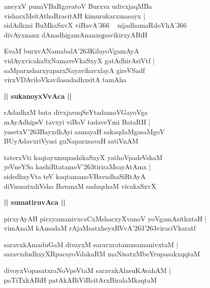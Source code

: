 \documentclass[twoside,12pt,openright]{book}
\def\S{\char'263}
\newcounter{shloka}[chapter]
\def\uvaca#1{\centerline{{\large\textbf{#1}}}}
\begin{document}
\begin{shloka}%
aneyxV punaVBaRgavatoV Burxva udivxjaqMBa \\
visharxMsitAthaRracitAH kimurukarxmasayx |\\
sidAdhxsi BuMkaSxvX viBavA\char'366 ~ nijadhamaRdoVhA\char'366 ~\\
divAyxnanx dAnadhigamAnanxqpavikirxyABiH
\end{shloka}

\begin{shloka}%
EvaM burxvANamabalA\S KilayoVgamAyA \\
vidAyxvicakaSxNamaveVkaSxyX gatAdhirAsiVtf |\\
saMparxsharxyaparxNayavihavxlayA gireVSadf \\
virxVDAviloVkavilasadadhxsitA tamAha
\end{shloka}

\uvaca{|| sukanoyxVvAca ||}

\begin{shloka}%
rAdadhxM bata divxjavaqSeYtadamoVGayoVga \\
mAyAdhipeV tavxyi viBoV tadaveYmi BataRH |\\
yasetxV\S BayxdhAyi samayaH sakaqdaMgasaMgoV \\
BUyAdavxriVyasi guNaparxsavaH satiVnAM 
\end{shloka}

\begin{shloka}%
taterxVti kaqtayxmupashikaSxyX  yathoVpadeVshaM \\
yeVneYSa kashiRtatamoV\S tiriraMsayAtAmx |\\
sidedhxyVta teV kaqtamanoVBavadhaSiRtAyA\\
diVnasatxdiVsha BavanaM sadaqshaM vicakaSxvX
\end{shloka}

\uvaca{|| sumatiruvAca ||}

\begin{shloka}%
pirxyAyAH pirxyamanivxcaCxMshacxyXvanoV yoVgamAsithxtaH |\\
vimAnaM kAmadaM rAjaMsatxheyxRVvA\S\S viraciVkaratf
\end{shloka}

\begin{shloka}%
saravxkAmaduGaM divayxM saravxratamxsamanivxtaM |\\
saravxdudhxyXRpacayoVdakaRM maNisatxMbeYrupasakxqqtaM 
\end{shloka}

\begin{shloka}%
divoyxVopasatxraNoVpeVtaM saravxkAlasuKAvahAM |\\
paTiTxkABiH patAkABiViRcitArxBiralaMkaqtaM
\end{shloka}
\end{document}
